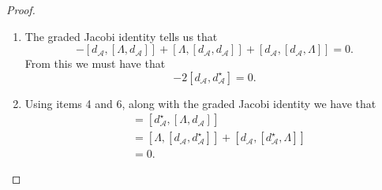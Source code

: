 \documentclass[10pt,a4paper]{amsart}
\newcommand{\A}{\mathcal{A}}
\begin{document}
\begin{proof}
\begin{enumerate}
            \item The graded Jacobi identity tells us that
            \begin{equation*}
                -[d_\A,[\Lambda,d_\A]]+[\Lambda,[d_\A,d_\A]]+ [d_\A,[d_\A,\Lambda]]=0.
            \end{equation*}
            From this we must have that
            \begin{equation*}
                -2[d_\A,d_\A^\star]=0.
            \end{equation*}
            
            \item Using items 4 and 6, along with the graded Jacobi identity we have that
            \begin{align*}
                [d_\A^\star,d_\A^\star]&=[d_\A^\star,[\Lambda, d_\A]] \\
                &=[\Lambda, [d_\A,d_\A^\star]]+[d_\A, [d_\A^\star, \Lambda]] \\
                &=0.
            \end{align*}
        \end{enumerate}
    \end{proof}
\end{document}
